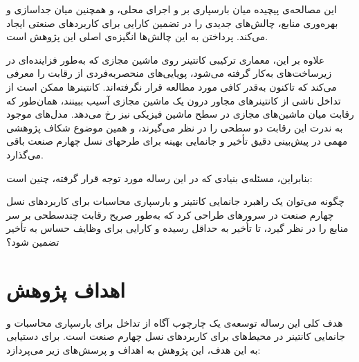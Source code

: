 این مصالحه‌ی پیچیده میان بارسپاری بر  و اجرای محلی، و همچنین میان جدا‌سازی و بهره‌وری منابع، چالش‌های جدیدی را در تضمین کارایی برای کاربردهای صنعتی ایجاد می‌کند. پرداختن به این چالش‌ها انگیزه‌ی اصلی این پژوهش است.

علاوه بر این، معماری ترکیبی کانتینر روی ماشین مجازی که به‌طور فزاینده‌ای در زیرساخت‌های  به‌کار گرفته می‌شود، پویایی‌های منحصربه‌فردی از رقابت را معرفی می‌کند که تاکنون به‌قدر کافی مورد مطالعه قرار نگرفته‌اند. کانتینرها ممکن است از تداخل ناشی از کانتینرهای مجاور درون یک ماشین مجازی آسیب ببینند، همان‌طور که رقابت میان ماشین‌های مجازی در سطح ماشین فیزیکی نیز رخ می‌دهد. مدل‌های موجود به ندرت این رقابت دو سطحی را در نظر می‌گیرند، و همین موضوع شکاف پژوهشی مهمی در پیش‌بینی دقیق تأخیر و جانمایی بهینه برای طرحهای نسل چهارم صنعت باقی می‌گذارد.

بنابراین، مسئله‌ی بنیادی که در این رساله مورد توجه قرار گرفته، چنین است:

چگونه می‌توان یک راهبرد جانمایی کانتینر و بارسپاری محاسبات برای کاربردهای نسل چهارم صنعت در سرورهای  طراحی کرد که به‌طور صریح رقابت چندسطحی بر سر منابع را در نظر گیرد، تا تأخیر به حداقل رسیده و کارایی برای وظایف حساس به تأخیر تضمین شود؟

\section{اهداف پژوهش}

هدف کلی این رساله توسعه‌ی یک چارچوب آگاه از تداخل برای بارسپاری محاسبات و جانمایی کانتینر در محیط‌های  برای کاربردهای نسل چهارم صنعت است. برای دستیابی به این هدف، این پژوهش به اهداف و پرسش‌های زیر می‌پردازد:

